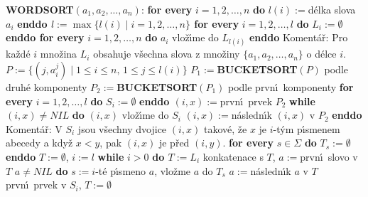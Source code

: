{\bf WORDSORT$(a_1,a_2,\dots,a_n)$}:\newline 
{\bf for every} $i=1,2,\dots,n$ {\bf do} $l(i):=$d\'elka slova $a_
i$ {\bf enddo\newline 
$l:=\max\{l(i)\mid i=1,2,\dots,n\}$\newline 
for every} $i=1,2,\dots,l$ {\bf do} $L_i:=\emptyset$ {\bf enddo\newline 
for every} $i=1,2,\dots,n$ {\bf do}\newline 
\phantom{---}$a_i$ vlo\v z\'\i me do $L_{l(i)}$\newline 
{\bf enddo}\newline 
Koment\'a\v r: Pro ka\v zd\'e $i$ mno\v zina $L_i$ obsahuje v\v sechna slova z mno\v ziny 
$\{a_1,a_2,\dots,a_n\}$ o d\'elce $i$.\newline 
$P:=\{(j,a_i^j)\mid 1\le i\le n,\,1\le j\le l(i)\}$\newline 
$P_1:=${\bf BUCKETSORT$(P)$} podle druh\'e komponenty\newline 
$P_2:=${\bf BUCKETSORT$(P_1)$} podle prvn\'\i\ komponenty\newline
{\bf for every} $i=1,2,\dots,l$ {\bf do} $S_i:=\emptyset$ {\bf enddo\newline 
$(i,x):=$}prvn\'\i\ prvek $P_2$\newline 
{\bf while} $(i,x)\ne NIL$ {\bf do}\newline 
\phantom{---}$(i,x)$ vlo\v z\'\i me do $S_i$\newline 
\phantom{---}$(i,x):=$n\'asledn\'\i k $(i,x)$ v $P_2$\newline 
{\bf enddo\newline}
Koment\'a\v r: V $S_i$ jsou v\v sechny dvojice $(i,x)$ takov\'e, \v ze $x$ 
je $i$-t\'ym p\'\i smenem abecedy a kdy\v z $x<y$, pak $(i,x)$ je 
p\v red $(i,y)$.\newline 
{\bf for every} $s\in\Sigma$ {\bf do} $T_s:=\emptyset$ {\bf enddo}\newline 
$T:=\emptyset$, $i:=l$\newline 
{\bf while} $i>0$ {\bf do\newline 
\phantom{---}$T:=L_i$} konkatenace s $T$, $a:=$prvn\'\i\ slovo v $T$\newline 
\phantom{---}{\bf while} $a\ne NIL$ {\bf do}\newline 
\phantom{------}$s:=i$-t\'e p\'\i smeno $a$, vlo\v zme $a$ do $T_s$\newline 
\phantom{------}$a:=$n\'asledn\'\i k $a$ v $T$\newline 
{}prvn\'\i\ prvek v $S_i$, $T:=\emptyset$\newline 
